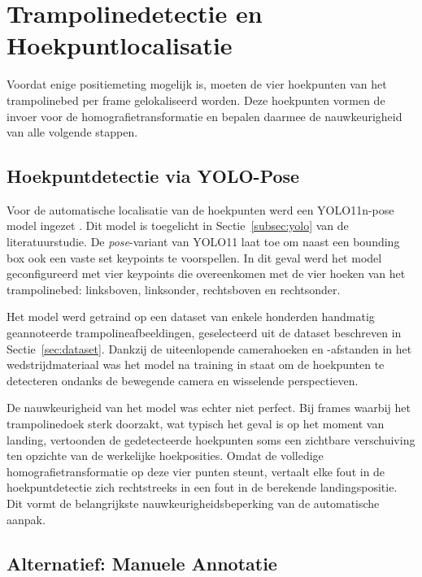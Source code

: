 
\section{Trampolinedetectie en Hoekpuntlocalisatie}
\label{sec:trampolinedetectie}

Voordat enige positiemeting mogelijk is, moeten de vier hoekpunten van het trampolinebed per frame gelokaliseerd worden. Deze hoekpunten vormen de invoer voor de homografietransformatie en bepalen daarmee de nauwkeurigheid van alle volgende stappen.

\subsection{Hoekpuntdetectie via YOLO-Pose}
\label{subsec:hoekpuntdetectie}

Voor de automatische localisatie van de hoekpunten werd een YOLO11n-pose model ingezet \autocite{Jocher_Ultralytics_YOLO_2023}. Dit model is toegelicht in Sectie~\ref{subsec:yolo} van de literatuurstudie. De \textit{pose}-variant van YOLO11 laat toe om naast een bounding box ook een vaste set keypoints te voorspellen. In dit geval werd het model geconfigureerd met vier keypoints die overeenkomen met de vier hoeken van het trampolinebed: linksboven, linksonder, rechtsboven en rechtsonder.

Het model werd getraind op een dataset van enkele honderden handmatig geannoteerde trampolineafbeeldingen, geselecteerd uit de dataset beschreven in Sectie~\ref{sec:dataset}. Dankzij de uiteenlopende camerahoeken en -afstanden in het wedstrijdmateriaal was het model na training in staat om de hoekpunten te detecteren ondanks de bewegende camera en wisselende perspectieven.

De nauwkeurigheid van het model was echter niet perfect. Bij frames waarbij het trampolinedoek sterk doorzakt, wat typisch het geval is op het moment van landing, vertoonden de gedetecteerde hoekpunten soms een zichtbare verschuiving ten opzichte van de werkelijke hoekposities. Omdat de volledige homografietransformatie op deze vier punten steunt, vertaalt elke fout in de hoekpuntdetectie zich rechtstreeks in een fout in de berekende landingspositie. Dit vormt de belangrijkste nauwkeurigheidsbeperking van de automatische aanpak.

\subsection{Alternatief: Manuele Annotatie}
\label{subsec:manuele-annotatie}

